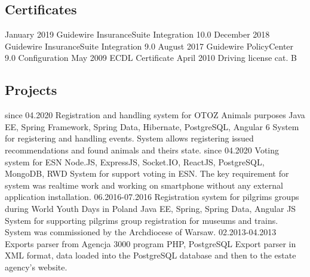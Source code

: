 \documentclass[]{friggeri-cv} %
\begin{document}
	\begin{absolutelynopagebreak}
		\section{Certificates}
		\begin{entrylist}
			\cert
			{January 2019}
			{Guidewire InsuranceSuite Integration 10.0}
			\cert
			{December 2018}
			{Guidewire InsuranceSuite Integration 9.0}
			\cert
			{August 2017}
			{Guidewire PolicyCenter 9.0 Configuration}
			\cert
			{May 2009}
			{ECDL Certificate}
			\cert
			{April 2010}
			{Driving license cat. B}
		\end{entrylist}
	\end{absolutelynopagebreak}
	
	\begin{absolutelynopagebreak}
		\section{Projects}
		\begin{entrylist}
			\entry
			{since 04.2020}
			{Registration and handling system for OTOZ Animals purposes}
			{Java EE, Spring Framework, Spring Data, Hibernate, PostgreSQL, Angular 6}
			{System for registering and handling events. System allows registering issued recommendations and found animals and theirs state.}
			\entry
			{since 04.2020}
			{Voting system for ESN}
			{Node.JS, ExpressJS, Socket.IO, ReactJS, PostgreSQL, MongoDB, RWD}
			{System for support voting in ESN. The key requirement for system was realtime work and working on smartphone without any external application installation.}
			\entry
			{06.2016-07.2016}
			{Registration system for pilgrims groups during World Youth Days in Poland}
			{Java EE, Spring, Spring Data, Angular JS}
			{System for supporting pilgrims group registration for museums and trains. System was commissioned by the Archdiocese of Warsaw.}
			\entry
			{02.2013-04.2013}
			{Exports parser from Agencja 3000 program}
			{PHP, PostgreSQL}
			{Export parser in XML format, data loaded into the PostgreSQL database and then to the estate agency's website.}
		\end{entrylist}
	\end{absolutelynopagebreak}
	
\end{document}
